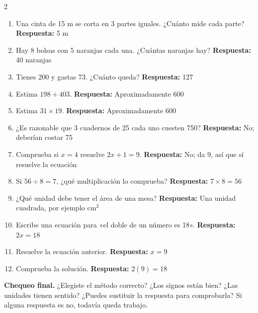 \documentclass[10pt,oneside,openany]{book}
\begin{document}
\begin{multicols}{2}\begin{enumerate}

\item Una cinta de 15 m se corta en 3 partes iguales. ¿Cuánto mide cada parte? \textbf{Respuesta:} 5 m

\item Hay 8 bolsas con 5 naranjas cada una. ¿Cuántas naranjas hay? \textbf{Respuesta:} 40 naranjas

\item Tienes \textdollar{}200 y gastas \textdollar{}73. ¿Cuánto queda? \textbf{Respuesta:} \textdollar{}127

\item Estima $198+403$. \textbf{Respuesta:} Aproximadamente 600

\item Estima $31\times19$. \textbf{Respuesta:} Aproximadamente 600

\item ¿Es razonable que 3 cuadernos de \textdollar{}25 cada uno cuesten \textdollar{}750? \textbf{Respuesta:} No; deberían costar \textdollar{}75

\item Comprueba si $x=4$ resuelve $2x+1=9$. \textbf{Respuesta:} No; da 9, así que sí resuelve la ecuación

\item Si $56\div8=7$, ¿qué multiplicación lo comprueba? \textbf{Respuesta:} $7\times8=56$

\item ¿Qué unidad debe tener el área de una mesa? \textbf{Respuesta:} Una unidad cuadrada, por ejemplo cm$^2$

\item Escribe una ecuación para «el doble de un número es 18». \textbf{Respuesta:} $2x=18$

\item Resuelve la ecuación anterior. \textbf{Respuesta:} $x=9$

\item Comprueba la solución. \textbf{Respuesta:} $2(9)=18$

\end{enumerate}\end{multicols}

\begin{idea}\textbf{Chequeo final.} ¿Elegiste el método correcto? ¿Los signos están bien? ¿Las unidades tienen sentido? ¿Puedes sustituir la respuesta para comprobarla? Si alguna respuesta es no, todavía queda trabajo.\end{idea}
\end{document}
